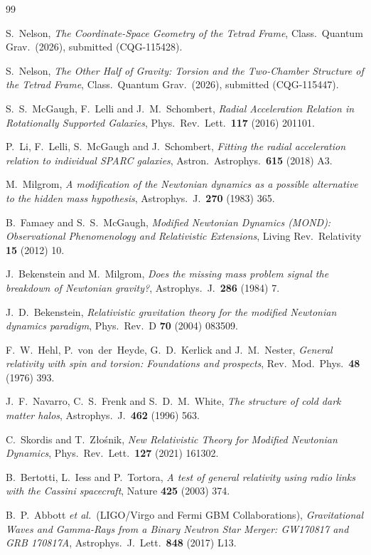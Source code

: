 \documentclass[twocolumn]{iopjournal}
\begin{document}
\begin{thebibliography}{99}

S.~Nelson,
\textit{The Coordinate-Space Geometry of the Tetrad Frame},
Class.\ Quantum Grav.\ (2026), submitted (CQG-115428).

S.~Nelson,
\textit{The Other Half of Gravity: Torsion and the
Two-Chamber Structure of the Tetrad Frame},
Class.\ Quantum Grav.\ (2026), submitted (CQG-115447).

S.~S.~McGaugh, F.~Lelli and J.~M.~Schombert,
\textit{Radial Acceleration Relation in Rotationally
Supported Galaxies},
Phys.\ Rev.\ Lett.\ \textbf{117} (2016) 201101.

P.~Li, F.~Lelli, S.~McGaugh and J.~Schombert,
\textit{Fitting the radial acceleration relation to
individual SPARC galaxies},
Astron.\ Astrophys.\ \textbf{615} (2018) A3.

M.~Milgrom,
\textit{A modification of the Newtonian dynamics as a
possible alternative to the hidden mass hypothesis},
Astrophys.\ J.\ \textbf{270} (1983) 365.

B.~Famaey and S.~S.~McGaugh,
\textit{Modified Newtonian Dynamics (MOND): Observational
Phenomenology and Relativistic Extensions},
Living Rev.\ Relativity \textbf{15} (2012) 10.

J.~Bekenstein and M.~Milgrom,
\textit{Does the missing mass problem signal the breakdown
of Newtonian gravity?},
Astrophys.\ J.\ \textbf{286} (1984) 7.

J.~D.~Bekenstein,
\textit{Relativistic gravitation theory for the modified
Newtonian dynamics paradigm},
Phys.\ Rev.\ D \textbf{70} (2004) 083509.

F.~W.~Hehl, P.~von~der~Heyde, G.~D.~Kerlick and
J.~M.~Nester,
\textit{General relativity with spin and torsion:
Foundations and prospects},
Rev.\ Mod.\ Phys.\ \textbf{48} (1976) 393.

J.~F.~Navarro, C.~S.~Frenk and S.~D.~M.~White,
\textit{The structure of cold dark matter halos},
Astrophys.\ J.\ \textbf{462} (1996) 563.

C.~Skordis and T.~Z\l{}o\'{s}nik,
\textit{New Relativistic Theory for Modified Newtonian
Dynamics},
Phys.\ Rev.\ Lett.\ \textbf{127} (2021) 161302.

B.~Bertotti, L.~Iess and P.~Tortora,
\textit{A test of general relativity using radio links with
the Cassini spacecraft},
Nature \textbf{425} (2003) 374.

B.~P.~Abbott \textit{et al.}\ (LIGO/Virgo and
Fermi GBM Collaborations),
\textit{Gravitational Waves and Gamma-Rays from a Binary
Neutron Star Merger: GW170817 and GRB 170817A},
Astrophys.\ J.\ Lett.\ \textbf{848} (2017) L13.

\end{thebibliography}
\end{document}
